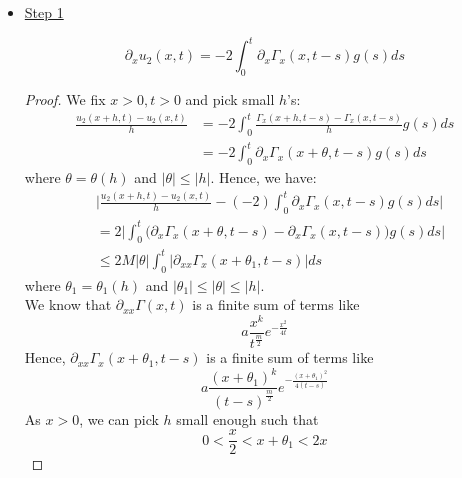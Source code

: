 \begin{itemize}
    \item \underline{Step 1}
    \begin{PropBox}
        \begin{Proposition}
            \begin{equation*}
                \partial_x u_2(x,t) = -2 \int_0^t \partial_x \Gamma_x(x,t-s) g(s) ds 
            \end{equation*}
        \end{Proposition}
    \end{PropBox}
    \begin{ProofBox}
    \begin{proof}
       We fix $x > 0, t  > 0$ and pick small $h$'s:
       \begin{align*}
           \frac{u_2(x+h,t) - u_2(x,t)}{h} &= -2 \int_0^t\frac{\Gamma_x(x+h,t-s) - \Gamma_x (x,t-s)}{h}g(s)ds \\
           &= -2 \int_0^t \partial_x \Gamma_x(x+\theta, t-s) g(s) ds 
       \end{align*}
       where $\theta = \theta(h)$ and $|\theta| \leq |h|$. Hence, we have:
       \begin{align*}
           & \Big|\frac{u_2(x+h,t)-u_2(x,t)}{h} - (-2) \int_0^t\partial_x\Gamma_x (x,t-s)g(s)ds \Big| \\
           &= 2 \Big|\int_0^t \Bigg(\partial_x \Gamma_x(x+\theta, t-s) - \partial_x \Gamma_x(x, t-s)\Bigg) g(s) ds \Big| \\
           &\leq 2 M |\theta| \int_0^t |\partial_{xx} \Gamma_x(x + \theta_1, t-s)| ds 
       \end{align*}
       where $\theta_1 = \theta_1(h)$ and $|\theta_1| \leq |\theta| \leq |h|$. \\
       We know that $\partial_{xx} \Gamma(x,t)$ is a finite sum of terms like 
       \begin{equation*}
           a \frac{x^k}{t^\frac{m}{2}} e^{-\frac{x^2}{4t}}
       \end{equation*}
       Hence, $\partial_{xx} \Gamma_x(x+\theta_1,t-s)$ is a finite sum of terms like
       \begin{equation*}
           a \frac{(x+\theta_1)^k}{(t-s)^\frac{m}{2}}e^{-\frac{(x+\theta_1)^2}{4 (t-s)}}
       \end{equation*}
       As $x > 0$, we can pick $h$ small enough such that 
       \begin{equation*}
           0 < \frac{x}{2} < x + \theta_1 < 2x 
       \end{equation*}

\end{proof}
\end{ProofBox}
\end{itemize}
